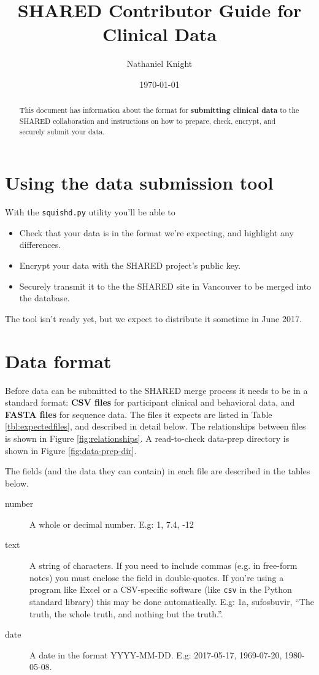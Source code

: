 \documentclass{article}
\author{Nathaniel Knight}
\date{\today}
\title{SHARED Contributor Guide for Clinical Data}
\begin{document}
\maketitle

\begin{abstract}
  This document has information about the format for
  \textbf{submitting clinical data} to the SHARED collaboration and
  instructions on how to prepare, check, encrypt, and securely submit
  your data.
\end{abstract}

\newpage

\section{Using the data submission tool}

With the \verb|squishd.py| utility you'll be able to 

\begin{itemize}
\item Check that your data is in the format we're expecting, and
  highlight any differences.
\item Encrypt your data with the SHARED project's public key.
\item Securely transmit it to the the SHARED site in Vancouver to be merged into the database.
\end{itemize}

The tool isn't ready yet, but we expect to distribute it sometime in June 2017.


\section{Data format}

Before data can be submitted to the SHARED merge process it needs to
be in a standard format: \textbf{CSV files} for participant clinical
and behavioral data, and \textbf{FASTA files} for sequence data. The
files it expects are listed in Table \ref{tbl:expectedfiles}, and
described in detail below. The relationships between files is shown in
Figure \ref{fig:relationships}. A read-to-check data-prep directory is
shown in Figure \ref{fig:data-prep-dir}.

The fields (and the data they can contain) in each file are described
in the tables below.

\begin{description}
\item[number] A whole or decimal number. E.g: 1, 7.4, -12
\item[text] A string of characters. If you need to include commas
  (e.g. in free-form notes) you must enclose the field in
  double-quotes. If you're using a program like Excel or a
  CSV-specific software (like \texttt{csv} in the Python standard
  library) this may be done automatically. E.g: 1a, sufosbuvir, ``The
  truth, the whole truth, and nothing but the truth.''.
\item[date] A date in the format YYYY-MM-DD. E.g: 2017-05-17, 1969-07-20, 1980-05-08.
\end{description}
\end{document}
